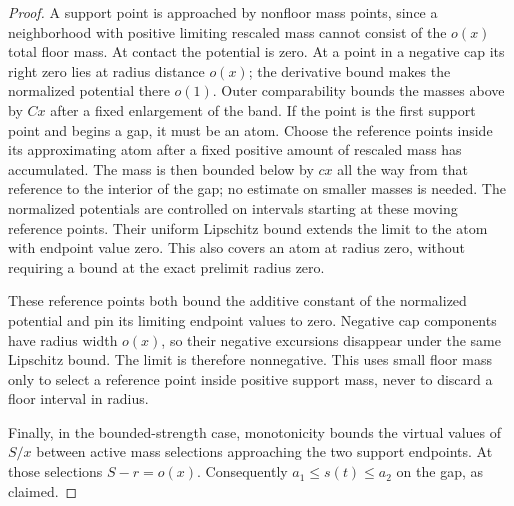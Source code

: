 \begin{proof}
A support point is approached by nonfloor mass points, since a
neighborhood with positive limiting rescaled mass cannot consist
of the $o(x)$ total floor mass. At contact the potential is zero.
At a point in a negative cap its right zero lies at radius distance
$o(x)$; the derivative bound makes the normalized potential there
$o(1)$. Outer comparability bounds the masses above by $Cx$ after
a fixed enlargement of the band. If the point is the first support
point and begins a gap, it must be an atom. Choose the reference
points inside its approximating atom after a fixed positive amount
of rescaled mass has accumulated. The mass is then bounded below
by $cx$ all the way from that reference to the interior of the gap;
no estimate on smaller masses is needed. The normalized potentials
are controlled on intervals starting at these moving reference
points. Their uniform Lipschitz bound extends the limit to the atom
with endpoint value zero. This also covers an atom at radius zero,
without requiring a bound at the exact prelimit radius zero.

These reference points both bound the additive constant of the
normalized potential and pin its limiting endpoint values to zero.
Negative cap components have radius width $o(x)$, so their negative
excursions disappear under the same Lipschitz bound. The limit is
therefore nonnegative. This uses small floor mass only to select a
reference point inside positive support mass, never to discard a
floor interval in radius.

Finally, in the bounded-strength case, monotonicity bounds the
virtual values of $S/x$ between active mass selections approaching
the two support endpoints. At those selections $S-r=o(x)$.
Consequently $a_1\le s(t)\le a_2$ on the gap, as claimed.
\end{proof}

